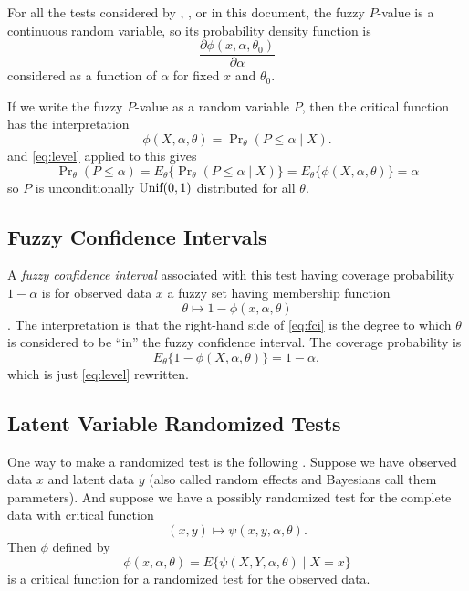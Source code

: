 \documentclass{article}
\newcommand{\UniformDis}{\text{\upshape Unif}}
\begin{document}
For all the tests considered
by \citet{geyer-meeden}, \citet{thompson-geyer}, or in this document,
the fuzzy $P$-value is a continuous random variable, so its probability
density function is
$$
   \frac{\partial \phi(x, \alpha, \theta_0)}{\partial \alpha}
$$
considered as a function of $\alpha$ for fixed $x$ and $\theta_0$.

If we write the fuzzy $P$-value as a random variable $P$, then the
critical function has the interpretation
$$
   \phi(X, \alpha, \theta) = \Pr\nolimits_\theta(P \le \alpha \mid X).
$$
and \eqref{eq:level} applied to this gives
$$
   \Pr\nolimits_\theta(P \le \alpha)
   =
   E_\theta\{ \Pr\nolimits_\theta(P \le \alpha \mid X) \}
   =
   E_\theta\{ \phi(X, \alpha, \theta) \}
   =
   \alpha
$$
so $P$ is unconditionally $\UniformDis(0, 1)$ distributed for all $\theta$.

\subsection{Fuzzy Confidence Intervals}

A \emph{fuzzy confidence interval} associated with this test
having coverage probability $1 - \alpha$ is
for observed data $x$ a fuzzy set having membership function
\begin{equation} \label{eq:fci}
   \theta \mapsto 1 - \phi(x, \alpha, \theta)
\end{equation}
\citep[Section~1.4]{geyer-meeden}.
The interpretation is that the right-hand side of \eqref{eq:fci} is
the degree to which $\theta$ is considered to be ``in'' the fuzzy confidence
interval.  The coverage probability is
$$
   E_\theta\{ 1 - \phi(X, \alpha, \theta) \} = 1 - \alpha,
$$
which is just \eqref{eq:level} rewritten.


\subsection{Latent Variable Randomized Tests}

One way to make a randomized test is the following \citep{thompson-geyer}.
Suppose we have observed data $x$ and latent data $y$ (also called random
effects and Bayesians call them parameters).  And suppose we have a
possibly randomized test for the complete data with critical function
$$
   (x, y) \mapsto \psi(x, y, \alpha, \theta).
$$
Then $\phi$ defined by
$$
   \phi(x, \alpha, \theta) = E \{ \psi(X, Y, \alpha, \theta) \mid X = x \}
$$
is a critical function for a randomized test for the observed data.
\end{document}
